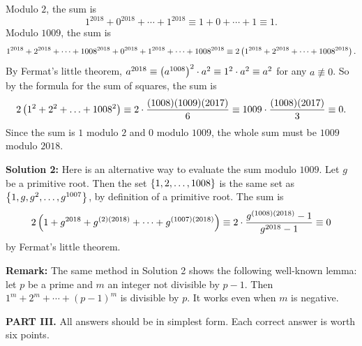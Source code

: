 \documentclass[11pt,paper=letter]{scrartcl}
\begin{document}
\begin{enumerate}[left=0pt]
Modulo $2$, the sum is $$1^{2018} + 0^{2018} + \cdots + 1^{2018} \equiv 1 + 0 + \cdots + 1 \equiv 1.$$ Modulo $1009$, the sum is $$1^{2018} + 2^{2018} + \cdots + 1008^{2018} + 0^{2018} + 1^{2018} + \cdots + 1008^{2018} \equiv 2\left( 1^{2018} + 2^{2018} + \cdots + 1008^{2018} \right).$$ By Fermat's little theorem, $a^{2018} \equiv \left( a^{1008} \right)^2 \cdot a^2 \equiv 1^2 \cdot a^2 \equiv a^2$ for any $a \not\equiv 0$. So by the formula for the sum of squares, the sum is $$2\left( 1^2 + 2^2 + \ldots + 1008^2 \right) \equiv 2 \cdot \frac{(1008)(1009)(2017)}6 \equiv 1009 \cdot \frac{(1008)(2017)}3 \equiv 0.$$ Since the sum is $1$ modulo $2$ and $0$ modulo $1009$, the whole sum must be $1009$ modulo $2018$.

\textbf{Solution 2:} Here is an alternative way to evaluate the sum modulo $1009$. Let $g$ be a primitive root. Then the set $\left\{ 1, 2, \ldots, 1008 \right\}$ is the same set as $\left\{ 1, g, g^2, \ldots, g^{1007} \right\}$, by definition of a primitive root. The sum is $$2\left( 1 + g^{2018} + g^{(2)(2018)} + \cdots + g^{(1007)(2018)} \right) \equiv 2 \cdot \frac{g^{(1008)(2018)} - 1}{g^{2018} - 1} \equiv 0$$ by Fermat's little theorem.

\textbf{Remark:} The same method in Solution 2 shows the following well-known lemma: let $p$ be a prime and $m$ an integer not divisible by $p-1$. Then $1^m + 2^m + \cdots + (p-1)^m$ is divisible by $p$. It works even when $m$ is negative.

\end{enumerate}

\noindent\textbf{PART III.} All answers should be in simplest form. Each correct answer is worth six points.
\end{document}

